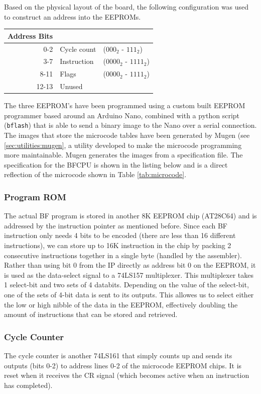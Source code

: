 Based on the physical layout of the board, the following configuration was used to construct an address into the EEPROMs.
\\
\begin{center}
\begin{tabular}{r|ll} 
  Address Bits & \\ \hline
  0-2  & Cycle count & ($000_2$ - $111_2$) \\
  3-7  & Instruction & ($0000_2$ - $1111_2$) \\
  8-11 & Flags & ($0000_2$ - $1111_2$) \\
  12-13 & Unused & 
\end{tabular}
\end{center}

The three EEPROM's have been programmed using a custom built EEPROM programmer based around an Arduino Nano, combined with a python script (\texttt{bflash}) that is able to send a binary image to the Nano over a serial connection. The images that store the microcode tables have been generated by Mugen (see \ref{sec:utilities:mugen}, a utility developed to make the microcode programming more maintainable. Mugen generates the images from a specification file. The specification for the BFCPU is shown in the listing below and is a direct reflection of the microcode shown in Table \ref{tab:microcode}.




\subsubsection{Program ROM}
The actual BF program is stored in another 8K EEPROM chip (AT28C64) and is addressed by the instruction pointer as mentioned before. Since each BF instruction only needs 4 bits to be encoded (there are less than 16 different instructions), we can store up to 16K instruction in the chip by packing 2 consecutive instructions together in a single byte (handled by the assembler). Rather than using bit 0 from the IP directly as address bit 0 on the EEPROM, it is used as the data-select signal to a 74LS157 multiplexer. This multiplexer takes 1 select-bit and two sets of 4 databits. Depending on the value of the select-bit, one of the sets of 4-bit data is sent to its outputs. This allowes us to select either the low or high nibble of the data in the EEPROM, effectively doubling the amount of instructions that can be stored and retrieved.
 
\subsubsection{Cycle Counter}
The cycle counter is another 74LS161 that simply counts up and sends its outputs (bits 0-2) to address lines 0-2 of the microcode EEPROM chips. It is reset when it receives the CR signal (which becomes active when an instruction has completed).


